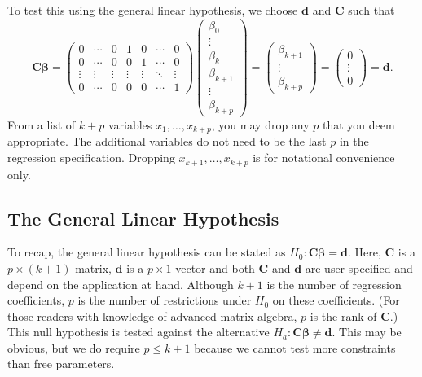 To test this using the general linear hypothesis, we choose
$\mathbf{d}$ and $\mathbf{C}$ such that
\begin{equation*}
\mathbf{C\boldsymbol \beta =}\left(
\begin{array}{ccccccc}
0 & \cdots  & 0 & 1 & 0 & \cdots  & 0 \\
0 & \cdots  & 0 & 0 & 1 & \cdots  & 0 \\
\vdots  & \vdots  & \vdots  & \vdots  & \vdots  & \ddots  & \vdots  \\
0 & \cdots  & 0 & 0 & 0 & \cdots  & 1%
\end{array}%
\right) \left(
\begin{array}{c}
\beta_0 \\
\vdots  \\
\beta_k \\
\beta_{k+1} \\
\vdots  \\
\beta_{k+p}%
\end{array}%
\right) =\left(
\begin{array}{c}
\beta_{k+1} \\
\vdots  \\
\beta_{k+p}%
\end{array}%
\right) =\left(
\begin{array}{c}
0 \\
\vdots  \\
0
\end{array}%
\right) =\mathbf{d}.
\end{equation*}
From a list of $k+p$ variables $x_1, \ldots, x_{k+p}$, you may drop
any $p$ that you deem appropriate. The additional variables do not
need to be the last $p$ in the regression specification. Dropping
$x_{k+1}, \ldots, x_{k+p}$ is for notational convenience only.


\subsection{The General Linear Hypothesis}\label{S4:GenLinHypo}

To recap, the general linear hypothesis can be stated as
$H_0:\mathbf{C \boldsymbol \beta =d}$. Here, $\mathbf{C}$ is a $p
\times (k+1)$ matrix, $\mathbf{d}$ is a $p \times 1$ vector and both
$\mathbf{C}$ and $\mathbf{d}$ are user specified and depend on the
application at hand. Although $k+1$ is the number of regression
coefficients, $p$ is the number of restrictions under $H_0$ on these
coefficients. (For those readers with knowledge of advanced matrix
algebra, $p$ is the rank of $\mathbf{C}$.) This null hypothesis is
tested against the alternative $H_a:\mathbf{C \boldsymbol \beta \neq
d}$. This may be obvious, but we do require $p \leq k+1$ because we
cannot test more constraints than free parameters.

